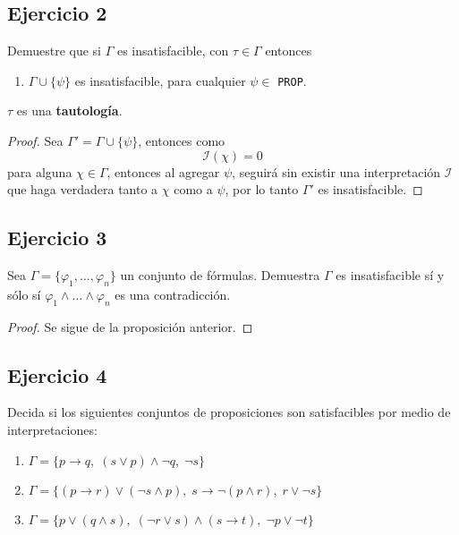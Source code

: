 \documentclass[a4paper]{article}
\begin{document}
\subsection{Ejercicio 2}
Demuestre que si \(\Gamma\) es insatisfacible, con \(\tau \in \Gamma\) entonces
\begin{enumerate}
    \item $\Gamma\cup\{\psi\}$ es insatisfacible, para cualquier \(\psi \in\) \texttt{PROP}.
\end{enumerate}
\(\tau\) es una \textbf{tautología}.
\begin{proof}
    Sea \(\Gamma' = \Gamma \cup \{\psi\}\), entonces
    como 
    \[
        \mathcal{I}\left(\chi\right) = 0
    \]
    para alguna \(\chi \in \Gamma\), entonces al agregar \(\psi\), seguirá sin existir una interpretación
    \(\mathcal{I}\) que haga verdadera tanto a \(\chi\) como a \(\psi\), por lo tanto \(\Gamma'\) es 
    insatisfacible.
\end{proof}
\subsection{Ejercicio 3}
\noindent
Sea $\Gamma=\{\varphi_1,\ldots,\varphi_n\}$ un conjunto de fórmulas. Demuestra $\Gamma$ es insatisfacible sí y sólo sí $\varphi_1\land\ldots\land\varphi_n$ es
una contradicción.
\begin{proof}
    Se sigue de la proposición anterior.
\end{proof}
\subsection{Ejercicio 4}
Decida si los siguientes conjuntos de proposiciones son satisfacibles por
medio de interpretaciones:
\begin{enumerate}
    \item $\Gamma = \{ p \to q,\; (s \lor p) \land \lnot q,\;\lnot s\}$
    \item $\Gamma = \{(p \to r) \lor (\lnot s \land p),\; s \to \lnot(p \land r),\; r \lor
          \lnot s\}$
    \item $\Gamma = \{p\lor (q\land s),\; (\lnot r \lor s) \land (s\to t),\; \lnot p \lor
          \lnot t \} $
\end{enumerate}
\end{document}
